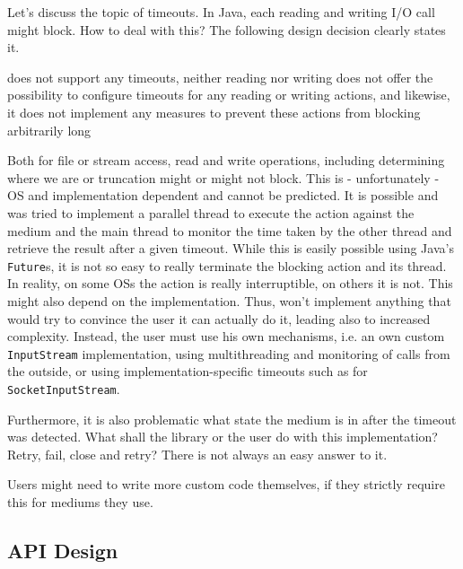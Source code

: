 Let's discuss the topic of timeouts. In Java, each reading and writing I/O call might block. How to deal with this? The following design decision clearly states it.

{%
\LibName{} does not support any timeouts, neither reading nor writing
}
{%
\COMPmedia{} does not offer the possibility to configure timeouts for any reading or writing actions, and likewise, it does not implement any measures to prevent these actions from blocking arbitrarily long
}
{%
Both for file or stream access, read and write operations, including determining where we are or truncation might or might not block. This is - unfortunately - OS and implementation dependent and cannot be predicted. It is possible and was tried to implement a parallel thread to execute the action against the medium and the main thread to monitor the time taken by the other thread and retrieve the result after a given timeout. While this is easily possible using Java's \texttt{Future}s, it is not so easy to really terminate the blocking action and its thread. In reality, on some OSs the action is really interruptible, on others it is not. This might also depend on the implementation. Thus, \LibName{} won't implement anything that would try to convince the user it can actually do it, leading also to increased complexity. Instead, the user must use his own mechanisms, i.e. an own custom \texttt{InputStream} implementation, using multithreading and monitoring of calls from the outside, or using implementation-specific timeouts such as for \texttt{SocketInputStream}.

Furthermore, it is also problematic what state the medium is in after the timeout was detected. What shall the library or the user do with this implementation? Retry, fail, close and retry? There is not always an easy answer to it.
}
{%
Users might need to write more custom code themselves, if they strictly require this for mediums they use.
}


\subsection{API Design}
\label{sec:InterfaceDesignCOMPmedia}

